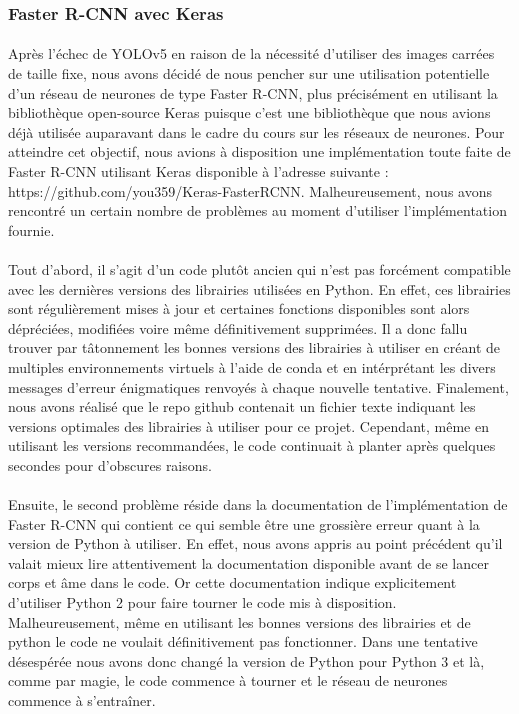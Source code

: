 \subsubsection{Faster R-CNN avec Keras}

\paragraph{} Après l'échec de YOLOv5 en raison de la nécessité d'utiliser des images carrées de taille fixe, nous avons décidé de nous pencher sur une utilisation potentielle d'un réseau de neurones de type Faster R-CNN, plus précisément en utilisant la bibliothèque open-source Keras puisque c'est une bibliothèque que nous avions déjà utilisée auparavant dans le cadre du cours sur les réseaux de neurones. Pour atteindre cet objectif, nous avions à disposition une implémentation toute faite de Faster R-CNN utilisant Keras disponible à l'adresse suivante : https://github.com/you359/Keras-FasterRCNN. Malheureusement, nous avons rencontré un certain nombre de problèmes au moment d'utiliser l'implémentation fournie.

\paragraph{} Tout d'abord, il s'agit d'un code plutôt ancien qui n'est pas forcément compatible avec les dernières versions des librairies utilisées en Python. En effet, ces librairies sont régulièrement mises à jour et certaines fonctions disponibles sont alors dépréciées, modifiées voire même définitivement supprimées. Il a donc fallu trouver par tâtonnement les bonnes versions des librairies à utiliser en créant de multiples environnements virtuels à l'aide de conda et en intérprétant les divers messages d'erreur énigmatiques renvoyés à chaque nouvelle tentative. Finalement, nous avons réalisé que le repo github contenait un fichier texte indiquant les versions optimales des librairies à utiliser pour ce projet. Cependant, même en utilisant les versions recommandées, le code continuait à planter après quelques secondes pour d'obscures raisons.

\paragraph{} Ensuite, le second problème réside dans la documentation de l'implémentation de Faster R-CNN qui contient ce qui semble être une grossière erreur quant à la version de Python à utiliser. En effet, nous avons appris au point précédent qu'il valait mieux lire attentivement la documentation disponible avant de se lancer corps et âme dans le code. Or cette documentation indique explicitement d'utiliser Python 2 pour faire tourner le code mis à disposition. Malheureusement, même en utilisant les bonnes versions des librairies et de python le code ne voulait définitivement pas fonctionner. Dans une tentative désespérée nous avons donc changé la version de Python pour Python 3 et là, comme par magie, le code commence à tourner et le réseau de neurones commence à s'entraîner.

